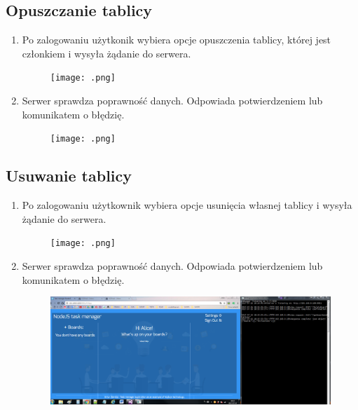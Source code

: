 \documentclass[12pt]{report}
\begin{document}
\begin{enumerate}
\begin{enumerate}
\begin{enumerate}
\subsection{Opuszczanie tablicy}
\begin{enumerate}
\item Po zalogowaniu użytkonik wybiera opcje opuszczenia tablicy, której jest członkiem i wysyła żądanie do serwera.
\begin{figure}[!t]
\centering
\texttt{[image: .png]}
\end{figure}
\item Serwer sprawdza poprawność danych. Odpowiada potwierdzeniem lub komunikatem o błędzię.
\begin{figure}[!t]
\centering
\texttt{[image: .png]}
\end{figure}
\end{enumerate}

\subsection{Usuwanie tablicy}
\begin{enumerate}
\item Po zalogowaniu użytkownik wybiera opcje usunięcia własnej tablicy i wysyła żądanie do serwera.
\begin{figure}[!t]
\centering
\texttt{[image: .png]}
\end{figure}
\item Serwer sprawdza poprawność danych. Odpowiada potwierdzeniem lub komunikatem o błędzię.
\begin{figure}[!t]
\centering
\includegraphics{E2.png}
\end{figure}
\end{enumerate}



\end{enumerate}
\end{enumerate}
\end{enumerate}
\end{document}
